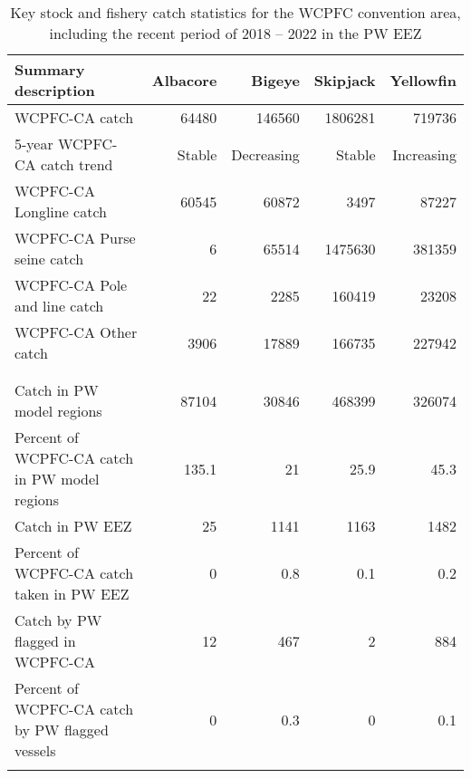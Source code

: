 \begin{longtable}{lrrrr}
\caption{Key stock and fishery catch statistics for the WCPFC convention area, including the recent period of 2018 -- 2022 in the PW EEZ} \\ 
  \hline
Summary description & Albacore & Bigeye & Skipjack & Yellowfin \\ 
  \hline
WCPFC-CA catch & 64480 & 146560 & 1806281 & 719736 \\ 
  5-year WCPFC-CA catch trend & Stable & Decreasing & Stable & Increasing \\ 
  WCPFC-CA Longline catch & 60545 & 60872 & 3497 & 87227 \\ 
  WCPFC-CA Purse seine catch & 6 & 65514 & 1475630 & 381359 \\ 
  WCPFC-CA Pole and line catch & 22 & 2285 & 160419 & 23208 \\ 
  WCPFC-CA Other catch & 3906 & 17889 & 166735 & 227942 \\ 
   &  &  &  &  \\ 
   \hline
 &  &  &  &  \\ 
  Catch in PW model regions & 87104 & 30846 & 468399 & 326074 \\ 
  Percent of WCPFC-CA catch in PW model regions & 135.1 & 21 & 25.9 & 45.3 \\ 
  Catch in PW EEZ & 25 & 1141 & 1163 & 1482 \\ 
  Percent of WCPFC-CA catch taken in PW EEZ & 0 & 0.8 & 0.1 & 0.2 \\ 
  Catch by PW flagged in WCPFC-CA & 12 & 467 & 2 & 884 \\ 
  Percent of WCPFC-CA catch by PW flagged vessels & 0 & 0.3 & 0 & 0.1 \\ 
  \hline
\label{cat_sum_tab}
\end{longtable}
